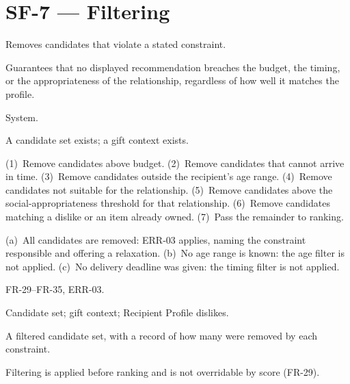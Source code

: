 \documentclass[11pt,a4paper]{report}
\begin{document}
\section{SF-7 --- Filtering}
\begin{description}[style=nextline,leftmargin=0pt]
\item[Description] Removes candidates that violate a stated constraint.
\item[Purpose] Guarantees that no displayed recommendation breaches the budget, the timing, or the appropriateness of the relationship, regardless of how well it matches the profile.
\item[Actors] System.
\item[Preconditions] A candidate set exists; a gift context exists.
\item[Main flow] (1)~Remove candidates above budget. (2)~Remove candidates that cannot arrive in time. (3)~Remove candidates outside the recipient's age range. (4)~Remove candidates not suitable for the relationship. (5)~Remove candidates above the social-appropriateness threshold for that relationship. (6)~Remove candidates matching a dislike or an item already owned. (7)~Pass the remainder to ranking.
\item[Alternative and exception flows] (a)~All candidates are removed: ERR-03 applies, naming the constraint responsible and offering a relaxation. (b)~No age range is known: the age filter is not applied. (c)~No delivery deadline was given: the timing filter is not applied.
\item[Requirements] FR-29--FR-35, ERR-03.
\item[Inputs] Candidate set; gift context; Recipient Profile dislikes.
\item[Outputs] A filtered candidate set, with a record of how many were removed by each constraint.
\item[Constraints] Filtering is applied before ranking and is not overridable by score (FR-29).
\end{description}
\end{document}
